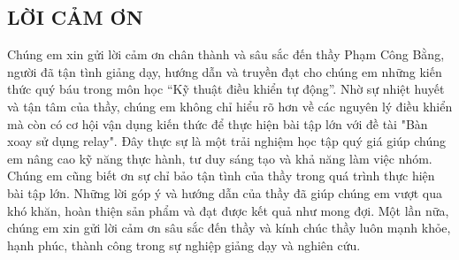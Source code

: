 \begin{center}
    \section*{LỜI CẢM ƠN}
\end{center}
\hspace*{1cm}Chúng em xin gửi lời cảm ơn chân thành và sâu sắc đến thầy Phạm Công Bằng, người đã tận tình giảng dạy, hướng dẫn và truyền đạt cho chúng em những kiến thức quý báu trong môn học “Kỹ thuật điều khiển tự động”.
Nhờ sự nhiệt huyết và tận tâm của thầy, chúng em không chỉ hiểu rõ hơn về các nguyên lý điều khiển mà còn có cơ hội vận dụng kiến thức để thực hiện bài tập lớn với đề tài "Bàn xoay sử dụng relay". Đây thực sự là một trải nghiệm học tập quý giá giúp chúng em nâng cao kỹ năng thực hành, tư duy sáng tạo và khả năng làm việc nhóm.
Chúng em cũng biết ơn sự chỉ bảo tận tình của thầy trong quá trình thực hiện bài tập lớn. Những lời góp ý và hướng dẫn của thầy đã giúp chúng em vượt qua khó khăn, hoàn thiện sản phẩm và đạt được kết quả như mong đợi.
Một lần nữa, chúng em xin gửi lời cảm ơn sâu sắc đến thầy và kính chúc thầy luôn mạnh khỏe, hạnh phúc, thành công trong sự nghiệp giảng dạy và nghiên cứu.
\cleardoublepage